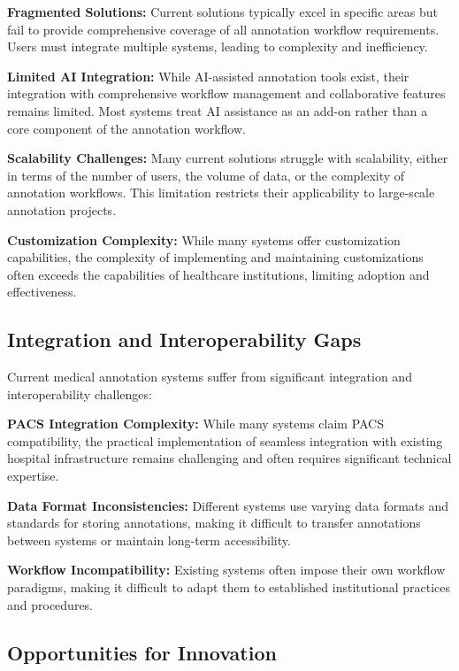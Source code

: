 \textbf{Fragmented Solutions:} Current solutions typically excel in specific areas but fail to provide comprehensive coverage of all annotation workflow requirements. Users must integrate multiple systems, leading to complexity and inefficiency.

\textbf{Limited AI Integration:} While AI-assisted annotation tools exist, their integration with comprehensive workflow management and collaborative features remains limited. Most systems treat AI assistance as an add-on rather than a core component of the annotation workflow.

\textbf{Scalability Challenges:} Many current solutions struggle with scalability, either in terms of the number of users, the volume of data, or the complexity of annotation workflows. This limitation restricts their applicability to large-scale annotation projects.

\textbf{Customization Complexity:} While many systems offer customization capabilities, the complexity of implementing and maintaining customizations often exceeds the capabilities of healthcare institutions, limiting adoption and effectiveness.

\subsection{Integration and Interoperability Gaps}

Current medical annotation systems suffer from significant integration and interoperability challenges:

\textbf{PACS Integration Complexity:} While many systems claim PACS compatibility, the practical implementation of seamless integration with existing hospital infrastructure remains challenging and often requires significant technical expertise.

\textbf{Data Format Inconsistencies:} Different systems use varying data formats and standards for storing annotations, making it difficult to transfer annotations between systems or maintain long-term accessibility.

\textbf{Workflow Incompatibility:} Existing systems often impose their own workflow paradigms, making it difficult to adapt them to established institutional practices and procedures.

\subsection{Opportunities for Innovation}


